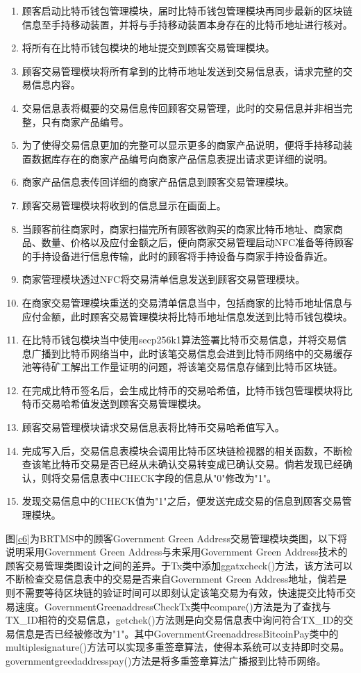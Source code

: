 	\begin{enumerate}
		\item 顾客启动比特币钱包管理模块，届时比特币钱包管理模块再同步最新的区块链信息至手持移动装置，并将与手持移动装置本身存在的比特币地址进行核对。
		\item 将所有在比特币钱包模块的地址提交到顾客交易管理模块。
		\item 顾客交易管理模块将所有拿到的比特币地址发送到交易信息表，请求完整的交易信息内容。
		\item 交易信息表将概要的交易信息传回顾客交易管理，此时的交易信息并非相当完整，只有商家产品编号。
		\item 为了使得交易信息更加的完整可以显示更多的商家产品说明，便将手持移动装置数据库存在的商家产品编号向商家产品信息表提出请求更详细的说明。
		\item 商家产品信息表传回详细的商家产品信息到顾客交易管理模块。
		\item 顾客交易管理模块将收到的信息显示在画面上。
		\item 当顾客前往商家时，商家扫描完所有顾客欲购买的商家比特币地址、商家商品、数量、价格以及应付金额之后，便向商家交易管理启动NFC准备等待顾客的手持设备进行信息传输，此时的顾客将手持设备与商家手持设备靠近。
		\item 商家管理模块透过NFC将交易清单信息发送到顾客交易管理模块。
		\item 在商家交易管理模块重送的交易清单信息当中，包括商家的比特币地址信息与应付金额，此时顾客交易管理模块将比特币地址信息发送到比特币钱包模块。
		\item 在比特币钱包模块当中使用secp256k1算法签署比特币交易信息，并将交易信息广播到比特币网络当中，此时该笔交易信息会进到⽐特币网络中的交易缓存池等待矿工解出工作量证明的问题，将该笔交易信息存储到比特币区块链。
		\item 在完成比特币签名后，会生成比特币的交易哈希值，比特币钱包管理模块将比特币交易哈希值发送到顾客交易管理模块。
		\item 顾客交易管理模块请求交易信息表将比特币交易哈希值写入。
		\item 完成写入后，交易信息表模块会调用比特币区块链检视器的相关函数，不断检查该笔比特币交易是否已经从未确认交易转变成已确认交易。倘若发现已经确认，则将交易信息表中CHECK字段的信息从"0"修改为"1"。
		\item 发现交易信息中的CHECK值为"1"之后，便发送完成交易的信息到顾客交易管理模块。
	\end{enumerate}

	图\ref{c6}为BRTMS中的顾客Government Green Address交易管理模块类图，以下将说明采用Government Green Address与未采用Government Green Address技术的顾客交易管理类图设计之间的差异。于Tx类中添加ggatxcheck()方法，该方法可以不断检查交易信息表中的交易是否来自Government Green Address地址，倘若是则不需要等待区块链的验证时间可以即刻认定该笔交易为有效，快速提交比特币交易速度。GovernmentGreenaddressCheckTx类中compare()方法是为了查找与TX\_ID相符的交易信息，getchek()方法则是向交易信息表中询问符合TX\_ID的交易信息是否已经被修改为"1"。其中GovernmentGreenaddressBitcoinPay类中的multiplesignature()方法可以实现多重签章算法，使得本系统可以支持即时交易。governmentgreedaddresspay()方法是将多重签章算法广播报到比特币网络。


